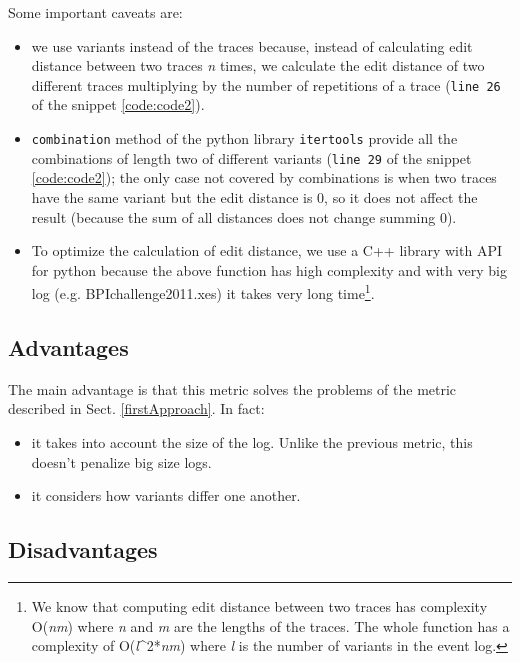 \documentclass[12pt]{article}
\begin{document}
\noident Some important caveats are:
\begin{itemize}
	\item we use variants instead of the traces because, instead of calculating edit distance between two traces \textit{n} times, we calculate the edit distance of two different traces multiplying by the number of repetitions of a trace (\texttt{line 26} of the snippet \ref{code:code2}).
	\item \texttt{combination} method of the python library \texttt{itertools} provide all the combinations of length two of different variants (\texttt{line 29} of the snippet \ref{code:code2}); the only case not covered by combinations is when two traces have the same variant but the edit distance is 0, so it does not affect the result (because the sum of all distances does not change summing 0).
	\item To optimize the calculation of edit distance, we use a C++ library with API for python because the above function has high complexity and with very big log (e.g. BPIchallenge2011.xes) it takes very long time\footnote{We know that computing edit distance between two traces has complexity O(\textit{nm}) where \textit{n} and \textit{m} are the lengths of the traces. The whole function has a complexity of O(\textit{l}\^{}2*\textit{nm}) where \textit{l} is the number of variants in the event log.}.
\end{itemize}

\subsection*{Advantages}

\noident The main advantage is that this metric solves the problems of the metric described in Sect. \ref{firstApproach}. In fact:
\begin{itemize}
	\item it takes into account the size of the log. Unlike the previous metric, this doesn't penalize big size logs.
	\item it considers how variants differ one another.
\end{itemize}

\subsection*{Disadvantages}
\end{document}
